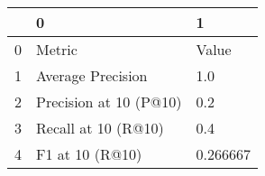 \begin{tabular}{lll}
\toprule
{} &                       0 &         1 \\
\midrule
0 &                  Metric &     Value \\
1 &       Average Precision &       1.0 \\
2 &  Precision at 10 (P@10) &       0.2 \\
3 &     Recall at 10 (R@10) &       0.4 \\
4 &         F1 at 10 (R@10) &  0.266667 \\
\bottomrule
\end{tabular}
